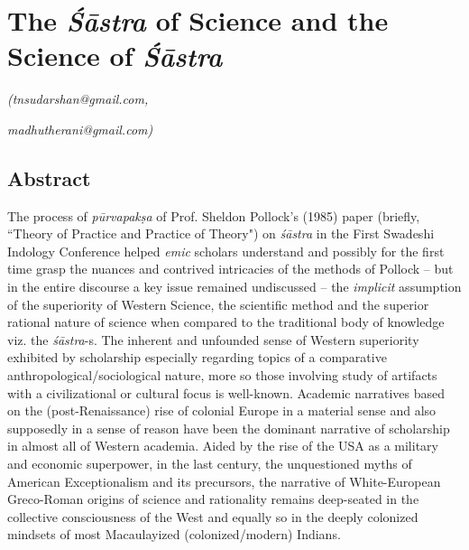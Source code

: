 
\chapter{The \textit{Śāstra} of Science and the Science of \textit{Śāstra}}\label{chapter9}


\begin{flushright}
\textit{\sf\em (tnsudarshan@gmail.com,}

\textit{madhutherani@gmail.com)}
\end{flushright}

\vskip 2pt

\section*{Abstract}

\vskip 4pt

The process of \textit{pūrvapakṣa} of Prof. Sheldon Pollock’s (1985) paper (briefly, ``Theory of Practice and Practice of Theory") on \textit{śāstra} in the First Swadeshi Indology Conference helped \textit{emic} scholars understand and possibly for the first time grasp the nuances and contrived intricacies of the methods of Pollock – but in the entire discourse a key issue remained undiscussed – the \textit{implicit} assumption of the superiority of Western Science, the scientific method and the superior rational nature of science when compared to the traditional body of knowledge viz. the \textit{śāstra}-s. The inherent and unfounded sense of Western superiority exhibited by scholarship especially regarding topics of a comparative anthropological/sociological nature, more so those involving study of artifacts with a civilizational or cultural focus is well-known. Academic narratives based on the (post-Renaissance) rise of colonial Europe in a material sense and also supposedly in a sense of reason have been the dominant narrative of scholarship in almost all of Western academia. Aided by the rise of the USA as a military and economic superpower, in the last century, the unquestioned myths of American Exceptionalism and its precursors, the narrative of White-European Greco-Roman origins of science and rationality remains deep-seated in the collective consciousness of the West and equally so in the deeply colonized mindsets of most Macaulayized (colonized/modern) Indians.

